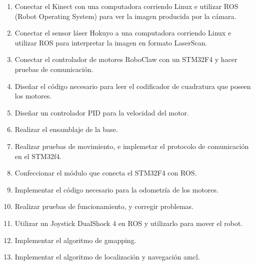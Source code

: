 \begin{enumerate}  %
    \item Conectar el Kinect con una computadora corriendo Linux e utilizar ROS (Robot Operating System) para ver la imagen producida por la cámara.
    \item Conectar el sensor láser Hokuyo a una computadora corriendo Linux e utilizar ROS para interpretar la imagen en formato LaserScan.
    \item Conectar el controlador de motores RoboClaw con un STM32F4 y hacer pruebas de comunicación.
    \item Diseñar el código necesario para leer el codificador de cuadratura que poseen los motores.
    \item Diseñar un controlador PID para la velocidad del motor.
    \item Realizar el ensamblaje de la base.
    \item Realizar pruebas de movimiento, e implemetar el protocolo de comunicación en el STM32f4.
    \item Confeccionar el módulo que conecta el STM32F4 con ROS.
    \item Implementar el código necesario para la odometría de los motores.
    \item Realizar pruebas de funcionamiento, y corregir problemas.
    \item Utilizar un Joystick DualShock 4 en ROS y utilizarlo para mover el robot.
    \item Implementar el algoritmo de gmapping.
    \item Implementar el algoritmo de localización y navegación amcl.

\end{enumerate}
